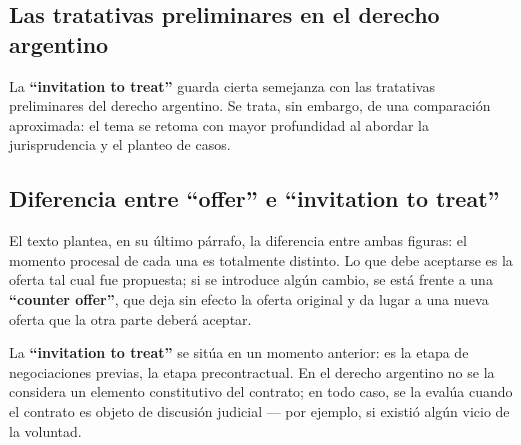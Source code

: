 \documentclass[12pt,oneside]{book}
\begin{document}
\subsection{Las tratativas preliminares en el derecho argentino}

La \textbf{``invitation to treat''} guarda cierta semejanza con las tratativas preliminares del derecho argentino. Se trata, sin embargo, de una comparación aproximada: el tema se retoma con mayor profundidad al abordar la jurisprudencia y el planteo de casos.

\subsection{\texorpdfstring{Diferencia entre ``offer'' e ``invitation to treat''}{Diferencia entre offer e invitation to treat}}

El texto plantea, en su último párrafo, la diferencia entre ambas figuras: el momento procesal de cada una es totalmente distinto. Lo que debe aceptarse es la oferta tal cual fue propuesta; si se introduce algún cambio, se está frente a una \textbf{``counter offer''}, que deja sin efecto la oferta original y da lugar a una nueva oferta que la otra parte deberá aceptar.

La \textbf{``invitation to treat''} se sitúa en un momento anterior: es la etapa de negociaciones previas, la etapa precontractual. En el derecho argentino no se la considera un elemento constitutivo del contrato; en todo caso, se la evalúa cuando el contrato es objeto de discusión judicial --- por ejemplo, si existió algún vicio de la voluntad.
\end{document}
